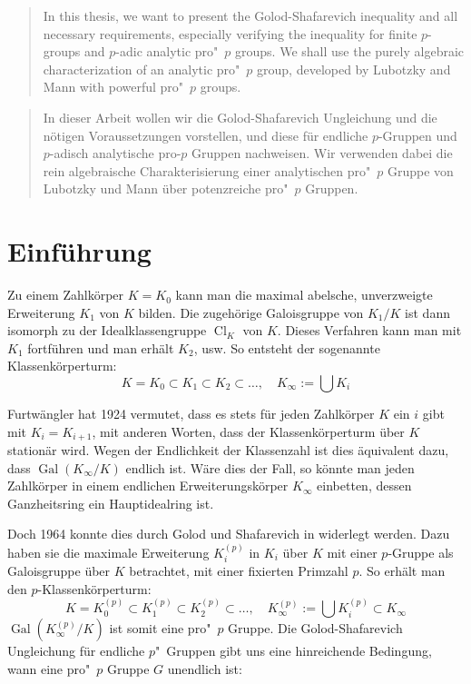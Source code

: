 \documentclass[11pt,a4paper,openany]{memoir}
\begin{document}
\vspace*{0cm}
\vfill
\renewcommand{\abstractname}{Abstract}
\begin{abstract}
In this thesis, we want to present the Golod-Shafarevich inequality and all nec\-es\-sary requirements, especially verifying the inequality for finite $p$-groups and $p$-adic analytic pro"~$p$ groups. We shall use the purely algebraic characterization of an analytic pro"~$p$ group, de\-vel\-oped by Lubotzky and Mann with powerful pro"~$p$ groups.
\end{abstract}

\vspace{1cm}

\renewcommand{\abstractname}{Zusammenfassung}
\begin{abstract}
In dieser Arbeit wollen wir die Golod-Shafarevich Ungleichung und die nötigen Voraussetzungen vorstellen, und diese für endliche $p$-Gruppen und $p$-adisch analytische pro-$p$ Gruppen nachweisen. Wir verwenden dabei die rein algebraische Charakterisierung einer analytischen pro"~$p$ Gruppe von Lubotzky und Mann über potenzreiche pro"~$p$ Gruppen.
\end{abstract}
\vfill
\clearpage

\setcounter{page}{5}
\tableofcontents

\chapter{Einführung}

Zu einem Zahlkörper $K=K_0$ kann man die maximal abelsche, unverzweigte Erweiterung $K_1$ von $K$ bilden. Die zugehörige Galoisgruppe von $K_1/K$ ist dann isomorph zu der Idealklassengruppe $\operatorname{Cl}_K$ von $K$. Dieses Verfahren kann man mit $K_1$ fortführen und man erhält $K_2$, usw. So entsteht der sogenannte Klassenkörperturm:
\[K=K_0\subset K_1\subset K_2\subset\ldots,\quad K_\infty:=\bigcup K_i \]

Furtwängler hat 1924 vermutet, dass es stets für jeden Zahlkörper $K$ ein $i$ gibt mit $K_i=K_{i+1}$, mit anderen Worten, dass der Klassenkörperturm über $K$ stationär wird. Wegen der Endlichkeit der Klassenzahl ist dies äquivalent dazu, dass $\operatorname{Gal}(K_\infty/K)$ endlich ist. Wäre dies der Fall, so könnte man jeden Zahlkörper in einem endlichen Erweiterungskörper $K_\infty$ einbetten, dessen Ganzheitsring ein Hauptidealring ist. 

Doch 1964 konnte dies durch Golod und Shafarevich in \cite{GS64} widerlegt werden. Dazu haben sie die maximale Erweiterung $K_i^{(p)}$ in $K_i$ über $K$ mit einer $p$-Gruppe als Galoisgruppe über $K$ betrachtet, mit einer fixierten Primzahl $p$. So erhält man den $p$-Klassenkörperturm:
\[K=K_0^{(p)}\subset K_1^{(p)}\subset K_2^{(p)}\subset\ldots,\quad K_\infty^{(p)}:=\bigcup K_i^{(p)}\subset K_\infty \]
$\operatorname{Gal}(K_\infty^{(p)}/K)$ ist somit eine pro"~$p$ Gruppe. Die Golod-Shafarevich Ungleichung für endliche $p$"~Gruppen gibt uns eine hinreichende Bedingung, wann eine pro"~$p$ Gruppe $G$ unendlich ist: 
\end{document}
